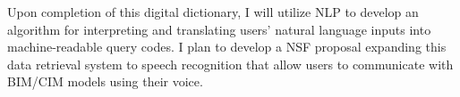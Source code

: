 \documentclass[a4paper,11pt]{article}
\begin{document}
%
Upon completion of this digital dictionary, I will utilize NLP to develop an algorithm for interpreting and translating users' natural language inputs into machine-readable query codes. 
%
%
%
%
%
I plan to develop a NSF proposal expanding this data retrieval system to speech recognition that allow users to communicate with BIM/CIM models using their voice.
%
%
\end{document}
